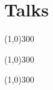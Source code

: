 \chapter{Talks}

\newpage

\begin{center}
  \line(1,0){300} \vspace{0.5cm}
\end{center}

\begin{center}
  \line(1,0){300} \vspace{0.5cm}
\end{center}

\begin{center}
  \line(1,0){300} \vspace{0.5cm}
\end{center}

